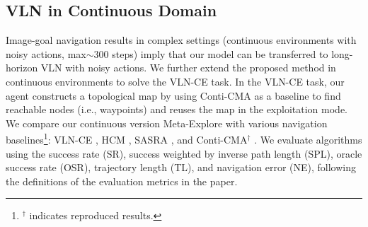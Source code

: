 \documentclass[10pt,twocolumn,letterpaper]{article}
\begin{document}
\subsection{VLN in Continuous Domain}

Image-goal navigation results in complex settings (continuous environments with noisy actions, max$\sim$300 steps) imply that our model can be transferred to long-horizon VLN with noisy actions. We further extend the proposed method in continuous environments to solve the VLN-CE \cite{krantz_vlnce_2020} task. In the VLN-CE \cite{krantz_vlnce_2020} task, our agent constructs a topological map by using Conti-CMA \cite{hong2022bridging} as a baseline to find reachable nodes (i.e., waypoints) and reuses the map in the exploitation mode. 
We compare our continuous version Meta-Explore with various navigation baselines\footnote{$^\dagger$ indicates reproduced results.}: VLN-CE \cite{krantz_vlnce_2020}, HCM \cite{irshad2021hierarchical}, SASRA \cite{Irshad2021sarsa}, and Conti-CMA$^\dagger$ \cite{hong2022bridging}. We evaluate algorithms using the success rate (SR), success weighted by inverse path length (SPL), oracle success rate (OSR), trajectory length (TL), and navigation error (NE), following the definitions of the evaluation metrics in the paper.

\begin{table}[tbp!]
\captionsetup{font=footnotesize}
\caption{\footnotesize Evaluation results in the VLN-CE val unseen split.
}
\label{tab:vlnce-baseline_results}\vspace{-0.3cm}
\end{table}
\end{document}
